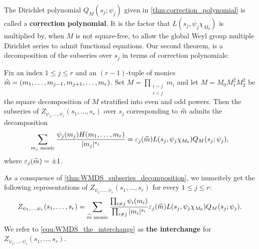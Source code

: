 \documentclass[12pt,reqno,oneside]{amsart}
\begin{document}
    The Dirichlet polynomial $Q_{M}(s_{j};\psi_{j})$ given in \cref{thm:correction_polynomial} is called a \textbf{correction polynomial}. It is the factor that $L(s_{j},\psi_{j}\chi_{M_{0}})$ is multiplied by, when $M$ is not square-free, to allow the global Weyl group multiple Dirichlet series to admit functional equations. Our second theorem, is a decomposition of the subseries over $s_{j}$ in terms of correction polynomials:

    \begin{theorem}\label{thm:WMDS_subseries_decomposition}
        Fix an index $1 \le j \le r$ and an $(r-1)$-tuple of monics $\widehat{m} = (m_{1},\ldots,m_{j-1},m_{j+1},\ldots,m_{r})$. Set $M = \prod_{\substack{i \sim j \\ i < j}}m_{i}$ and let $M = M_{0}M_{1}^{2}M_{2}^{2}$ be the square decomposition of $M$ stratified into even and odd powers. Then the subseries of $Z_{\psi_{1},\ldots,\psi_{r}}(s_{1},\ldots,s_{r})$ over $s_{j}$ corresponding to $\widehat{m}$ admits the decomposition
        \[
            \sum_{\text{$m_{j}$ monic}}\frac{\psi_{j}(m_{j})H(m_{1},\ldots,m_{r})}{|m_{j}|^{s_{j}}} = \varepsilon_{j}(\widehat{m})L(s_{j},\psi_{j}\chi_{M_{0}})Q_{M}(s_{j};\psi_{j}),
        \]
        where $\varepsilon_{j}(\widehat{m}) = \pm1$.
    \end{theorem}

    As a consquence of \cref{thm:WMDS_subseries_decomposition}, we immeitely get the following representations of $Z_{\psi_{1},\ldots,\psi_{r}}(s_{1},\ldots,s_{r})$ for every $1 \le j \le r$:
    \begin{equation}\label{equ:WMDS_the_interchange}
        Z_{\psi_{1},\ldots,\psi_{r}}(s_{1},\ldots,s_{r}) = \sum_{\text{$\widehat{m}$ monic}}\frac{\prod_{i \neq j}\psi_{i}(m_{i})}{\prod_{i \neq j}|m_{i}|^{s_{i}}}\varepsilon_{j}(\widehat{m})L(s_{j},\psi_{j}\chi_{M_{0}})Q_{M}(s_{j};\psi_{j}).
    \end{equation}
    We refer to \cref{equ:WMDS_the_interchange} as \textbf{the interchange} for $Z_{\psi_{1},\ldots,\psi_{r}}(s_{1},\ldots,s_{r})$. 
\end{document}
